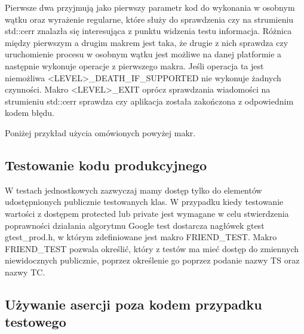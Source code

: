 \documentclass[12pt,a4paper,notitlepage]{report}
\begin{document}
Pierwsze dwa przyjmują jako pierwszy parametr kod do wykonania w osobnym wątku oraz wyrażenie regularne, które służy do sprawdzenia czy na strumieniu std::cerr znalazła się interesująca z punktu widzenia testu informacja. Różnica między pierwszym a drugim makrem jest taka, że drugie z nich sprawdza czy uruchomienie procesu w osobnym wątku jest możliwe na danej platformie a następnie wykonuje operacje z pierwszego makra. Jeśli operacja ta jest niemożliwa <LEVEL>{\_}DEATH{\_}IF{\_}SUPPORTED nie wykonuje żadnych czynności.
Makro <LEVEL>{\_}EXIT oprócz sprawdzania wiadomości na strumieniu std::cerr sprawdza czy aplikacja została zakończona z odpowiednim kodem błędu.

Poniżej przykład użycia omówionych powyżej makr.

			

\subsection{Testowanie kodu produkcyjnego}

W testach jednostkowych zazwyczaj mamy dostęp tylko do elementów udostępnionych publicznie testowanych klas. W przypadku kiedy testowanie wartości z dostępem protected lub private jest wymagane w celu stwierdzenia poprawności działania algorytmu Google test dostarcza nagłówek gtest\\gtest{\_}prod.h, w którym zdefiniowane jest makro FRIEND{\_}TEST.
Makro FRIEND{\_}TEST pozwala określić, który z testów ma mieć dostęp do zmiennych niewidocznych publicznie, poprzez określenie go poprzez podanie nazwy TS oraz nazwy TC.

			

\subsection{Używanie asercji poza kodem przypadku testowego}
\end{document}

